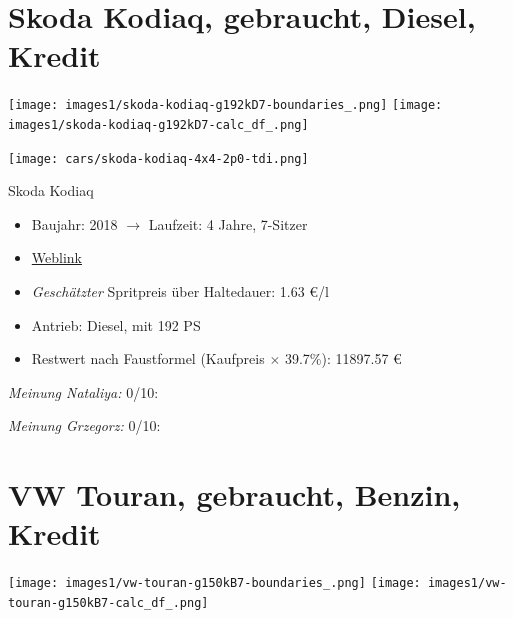 \documentclass[landscape, DIV=99, 14pt]{scrartcl}
\begin{document}
\pagebreak


\twocolumn

\section*{Skoda Kodiaq, gebraucht, Diesel, Kredit}
\begin{center}
\texttt{[image: images1/skoda-kodiaq-g192kD7-boundaries\_.png]}
\null
\vspace{0.5cm}
\texttt{[image: images1/skoda-kodiaq-g192kD7-calc\_df\_.png]}
\end{center}

\pagebreak
\begin{center}
\texttt{[image: cars/skoda-kodiaq-4x4-2p0-tdi.png]}

Skoda Kodiaq
\end{center}

\begin{itemize}
    \item Baujahr: 2018 $\rightarrow$ Laufzeit: 4 Jahre, 7-Sitzer
    \item \href{https://suchen.mobile.de/fahrzeuge/details.html?action=parkItem&id=336544234}{Weblink}
    \item \emph{Gesch\"atzter} Spritpreis \"uber Haltedauer: 1.63 \euro{}/l
    \item Antrieb: Diesel, mit 192 PS
    \item Restwert nach Faustformel (Kaufpreis $\times$ 39.7\%): 11897.57 \euro{}
\end{itemize}

\begin{small}
\emph{Meinung Nataliya:} 0/10: 
        
\emph{Meinung Grzegorz:} 0/10: 
\end{small}

\pagebreak


\twocolumn

\section*{VW Touran, gebraucht, Benzin, Kredit}
\begin{center}
\texttt{[image: images1/vw-touran-g150kB7-boundaries\_.png]}
\null
\vspace{0.5cm}
\texttt{[image: images1/vw-touran-g150kB7-calc\_df\_.png]}
\end{center}
\end{document}
